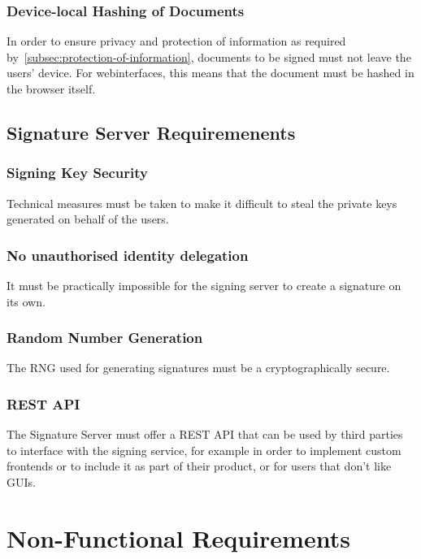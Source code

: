 \subsection{Device-local Hashing of Documents}\label{subsec:local-hashing-of-documents}
In order to ensure privacy and protection of information as required by~\ref{subsec:protection-of-information},
documents to be signed must not leave the users' device.
For webinterfaces, this means that the document must be hashed in the browser itself.

\section{Signature Server Requiremenents}
\label{sec:signatureserverrequirements}
\subsection{Signing Key Security}\label{subsec:signing-key-security}
Technical measures must be taken to make it difficult to steal the private keys generated on behalf of the users.

\subsection{No unauthorised identity delegation}\label{subsec:no-unauthorised-identity-delegation}
It must be practically impossible for the signing server to create a signature on its own.

\subsection{Random Number Generation}\label{subsec:random-number-generation}
The \gls{RNG} used for generating signatures must be a cryptographically secure.

\subsection{REST API}\label{subsec:rest-api}
The Signature Server must offer a \gls{REST} \gls{API} that can be used by third parties to interface with the signing service,
for example in order to implement custom frontends or to include it as part of their product,
or for users that don't like \gls{GUI}s.

\chapter{Non-Functional Requirements}
\label{ch:nonfunctionalrequirements}

